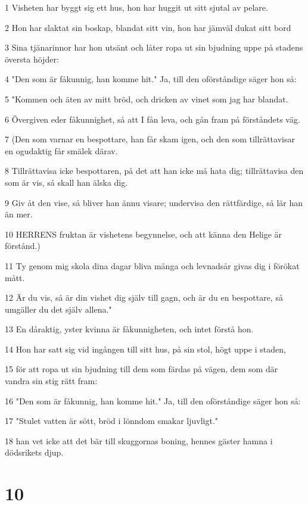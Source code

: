\par 1 Visheten har byggt sig ett hus, hon har huggit ut sitt sjutal av pelare.
\par 2 Hon har slaktat sin boskap, blandat sitt vin, hon har jämväl dukat sitt bord
\par 3 Sina tjänarinnor har hon utsänt och låter ropa ut sin bjudning uppe på stadens översta höjder:
\par 4 "Den som är fåkunnig, han komme hit." Ja, till den oförståndige säger hon så:
\par 5 "Kommen och äten av mitt bröd, och dricken av vinet som jag har blandat.
\par 6 Övergiven eder fåkunnighet, så att I fån leva, och gån fram på förståndets väg.
\par 7 (Den som varnar en bespottare, han får skam igen, och den som tillrättavisar en ogudaktig får smälek därav.
\par 8 Tillrättavisa icke bespottaren, på det att han icke må hata dig; tillrättavisa den som är vis, så skall han älska dig.
\par 9 Giv åt den vise, så bliver han ännu visare; undervisa den rättfärdige, så lär han än mer.
\par 10 HERRENS fruktan är vishetens begynnelse, och att känna den Helige är förstånd.)
\par 11 Ty genom mig skola dina dagar bliva många och levnadsår givas dig i förökat mått.
\par 12 Är du vis, så är din vishet dig själv till gagn, och är du en bespottare, så umgäller du det själv allena."
\par 13 En dåraktig, yster kvinna är fåkunnigheten, och intet förstå hon.
\par 14 Hon har satt sig vid ingången till sitt hus, på sin stol, högt uppe i staden,
\par 15 för att ropa ut sin bjudning till dem som färdas på vägen, dem som där vandra sin stig rätt fram:
\par 16 "Den som är fåkunnig, han komme hit." Ja, till den oförståndige säger hon så:
\par 17 "Stulet vatten är sött, bröd i lönndom smakar ljuvligt."
\par 18 han vet icke att det bär till skuggornas boning, hennes gäster hamna i dödsrikets djup.

\chapter{10}

